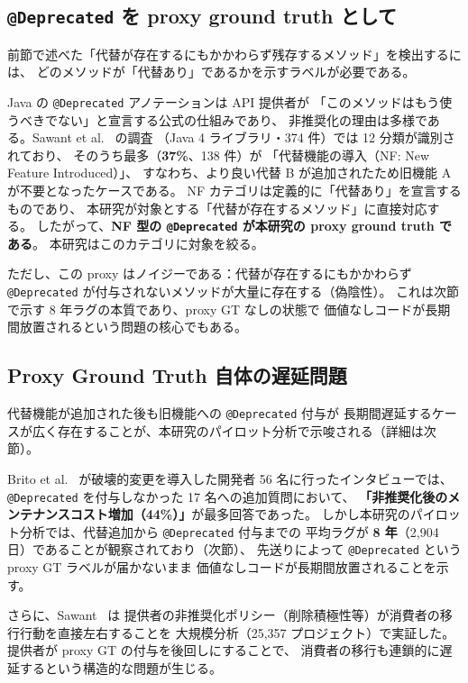 \documentclass[a4paper,12pt]{article}
\begin{document}
\subsection*{\texttt{@Deprecated} を proxy ground truth として}

前節で述べた「代替が存在するにもかかわらず残存するメソッド」を検出するには、
どのメソッドが「代替あり」であるかを示すラベルが必要である。

Java の \texttt{@Deprecated} アノテーションは API 提供者が
「このメソッドはもう使うべきでない」と宣言する公式の仕組みであり、
非推奨化の理由は多様である。Sawant et al.~\cite{sawant2018why-deprecated} の調査
（Java 4 ライブラリ・374 件）では 12 分類が識別されており、
そのうち最多（\textbf{37\%}、138 件）が
「代替機能の導入（NF: New Feature Introduced）」、
すなわち、より良い代替 B が追加されたため旧機能 A が不要となったケースである。
NF カテゴリは定義的に「代替あり」を宣言するものであり、
本研究が対象とする「代替が存在するメソッド」に直接対応する。
したがって、\textbf{NF 型の \texttt{@Deprecated} が本研究の proxy ground truth である}。
本研究はこのカテゴリに対象を絞る。

ただし、この proxy はノイジーである：代替が存在するにもかかわらず
\texttt{@Deprecated} が付与されないメソッドが大量に存在する（偽陰性）。
これは次節で示す 8 年ラグの本質であり、proxy GT なしの状態で
価値なしコードが長期間放置されるという問題の核心でもある。

\subsection*{Proxy Ground Truth 自体の遅延問題}

代替機能が追加された後も旧機能への \texttt{@Deprecated} 付与が
長期間遅延するケースが広く存在することが、本研究のパイロット分析で示唆される（詳細は次節）。

Brito et al.~\cite{brito2017java-bc} が破壊的変更を導入した開発者 56 名に行ったインタビューでは、
\texttt{@Deprecated} を付与しなかった 17 名への追加質問において、
\textbf{「非推奨化後のメンテナンスコスト増加（44\%）」}が最多回答であった。
しかし本研究のパイロット分析では、代替追加から \texttt{@Deprecated} 付与までの
平均ラグが \textbf{8 年}（2,904 日）であることが観察されており（次節）、
先送りによって \texttt{@Deprecated} という proxy GT ラベルが届かないまま
価値なしコードが長期間放置されることを示す。

さらに、Sawant~\cite{sawant2019api-evolution} は
提供者の非推奨化ポリシー（削除積極性等）が消費者の移行行動を直接左右することを
大規模分析（25,357 プロジェクト）で実証した。
提供者が proxy GT の付与を後回しにすることで、
消費者の移行も連鎖的に遅延するという構造的な問題が生じる。
\end{document}
